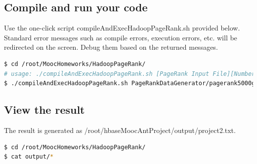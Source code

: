 
\subsection{Compile and run your code}

Use the one-click script compileAndExecHadoopPageRank.sh provided below.
Standard error messages such as compile errors, execution errors, etc. will be
redirected on the screen. Debug them based on the returned messages.

\begin{lstlisting}[language=bash]
$ cd /root/MoocHomeworks/HadoopPageRank/
# usage: ./compileAndExecHadoopPageRank.sh [PageRank Input File][Number of Urls][Number Of Iterations]
$ ./compileAndExecHadoopPageRank.sh PageRankDataGenerator/pagerank5000g50.input.0 5000 1
\end{lstlisting}

\subsection{View the result}
The result is generated as /root/hbaseMoocAntProject/output/project2.txt. 
\begin{lstlisting}[language=bash]
$ cd /root/MoocHomeworks/HadoopPageRank/
$ cat output/*
\end{lstlisting}
